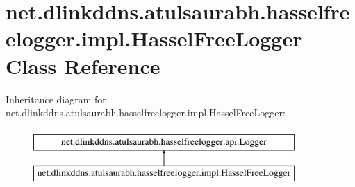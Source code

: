 \hypertarget{classnet_1_1dlinkddns_1_1atulsaurabh_1_1hasselfreelogger_1_1impl_1_1_hassel_free_logger}{}\section{net.\+dlinkddns.\+atulsaurabh.\+hasselfreelogger.\+impl.\+Hassel\+Free\+Logger Class Reference}
\label{classnet_1_1dlinkddns_1_1atulsaurabh_1_1hasselfreelogger_1_1impl_1_1_hassel_free_logger}
Inheritance diagram for net.\+dlinkddns.\+atulsaurabh.\+hasselfreelogger.\+impl.\+Hassel\+Free\+Logger\+:\begin{figure}[H]
\begin{center}
\leavevmode
\includegraphics[height=2.000000cm]{d8/de1/classnet_1_1dlinkddns_1_1atulsaurabh_1_1hasselfreelogger_1_1impl_1_1_hassel_free_logger}
\end{center}
\end{figure}
